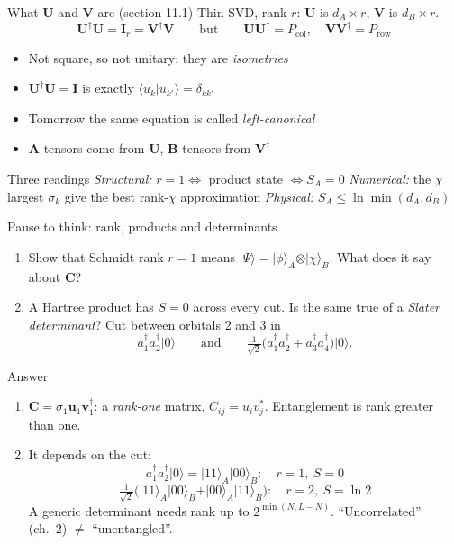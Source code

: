 \documentclass[aspectratio=169,10pt]{beamer}
\newcounter{thinkctr}
\newcommand{\thinkq}[2]{%
  \stepcounter{thinkctr}%
  \begin{tcolorbox}[colback=palewarm,colframe=warm,title={\bfseries Pause to think \#\thethinkctr\hfill\mdseries\small(about #1 min -- discuss with your neighbour)},fonttitle=\bfseries]
  #2
  \end{tcolorbox}}
\newcommand{\thinka}[1]{%
  \begin{tcolorbox}[colback=paleteal,colframe=teal,title={\bfseries Answer to pause \#\thethinkctr}]
  #1
  \end{tcolorbox}}
\newcommand{\ket}[1]{\vert #1\rangle}
\newcommand{\braket}[2]{\langle #1\vert #2\rangle}
\newcommand{\bmat}[1]{\bm{#1}}
\newcommand{\ad}[1]{a_{#1}^{\dagger}}
\begin{document}
\begin{frame}{What $\bmat U$ and $\bmat V$ are (section 11.1)}
  Thin SVD, rank $r$: $\bmat U$ is $d_A\times r$, $\bmat V$ is $d_B\times r$.
  \[
    \bmat U^{\dagger}\bmat U=\bmat I_r=\bmat V^{\dagger}\bmat V
    \qquad\text{but}\qquad
    \bmat U\bmat U^{\dagger}=P_{\mathrm{col}},\quad \bmat V\bmat V^{\dagger}=P_{\mathrm{row}}
  \]
  \begin{itemize}
    \item Not square, so \alert{not unitary}: they are \emph{isometries}
    \item $\bmat U^{\dagger}\bmat U=\bmat I$ is exactly $\braket{u_k}{u_{k'}}=\delta_{kk'}$
    \item Tomorrow the same equation is called \emph{left-canonical}
    \item $\bmat A$ tensors come from $\bmat U$, $\bmat B$ tensors from $\bmat V^{\dagger}$
  \end{itemize}
  \vspace{0.6em}
  \begin{block}{Three readings}
    \emph{Structural:} $r=1\iff$ product state $\iff S_A=0$ \quad
    \emph{Numerical:} the $\chi$ largest $\sigma_k$ give the best rank-$\chi$ approximation \quad
    \emph{Physical:} $S_A\le\ln\min(d_A,d_B)$
  \end{block}
\end{frame}

\begin{frame}{Pause to think: rank, products and determinants}
  \thinkq{4}{
  \begin{enumerate}
    \item Show that Schmidt rank $r=1$ means $\ket\Psi=\ket\phi_A\otimes\ket\chi_B$. What does it say about $\bmat C$?
    \item A Hartree product has $S=0$ across every cut. Is the same true of a \emph{Slater determinant}? Cut between orbitals 2 and 3 in
    \[
      \ad1\ad2\ket0
      \qquad\text{and}\qquad
      \tfrac1{\sqrt2}\bigl(\ad1\ad2+\ad3\ad4\bigr)\ket0 .
    \]
  \end{enumerate}}
\end{frame}

\begin{frame}{Answer}
  \thinka{
  \begin{enumerate}
    \item $\bmat C=\sigma_1\bm u_1\bm v_1^{\dagger}$: a \emph{rank-one} matrix, $C_{ij}=u_iv_j^{*}$. Entanglement is rank greater than one.
    \item It depends on the cut:
    \[
      \ad1\ad2\ket0=\ket{11}_A\ket{00}_B:\quad r=1,\ S=0
    \]
    \[
      \tfrac1{\sqrt2}\bigl(\ket{11}_A\ket{00}_B+\ket{00}_A\ket{11}_B\bigr):\quad r=2,\ S=\ln2
    \]
    A generic determinant needs rank up to $2^{\min(N,L-N)}$. \alert{``Uncorrelated'' (ch.~2) $\ne$ ``unentangled''.}
  \end{enumerate}}
\end{frame}
\end{document}
